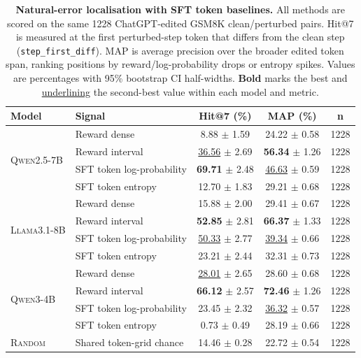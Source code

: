 \begin{table}[t]
\centering
\small
\setlength{\tabcolsep}{5pt}
\caption{\textbf{Natural-error localisation with SFT token baselines.} All methods are scored on the same 1228 ChatGPT-edited GSM8K clean/perturbed pairs. Hit@7 is measured at the first perturbed-step token that differs from the clean step (\texttt{step\_first\_diff}). MAP is average precision over the broader edited token span, ranking positions by reward/log-probability drops or entropy spikes. Values are percentages with 95\% bootstrap CI half-widths. \textbf{Bold} marks the best and \underline{underlining} the second-best value within each model and metric.}
\label{tab:localisation_chatgpt_step_sft_hit7_map}
\begin{tabular}{llccc}
\toprule
\textbf{Model} & \textbf{Signal} & \textbf{Hit@7 (\%)} & \textbf{MAP (\%)} & \textbf{n} \\
\midrule
\multirow{4}{*}{\textsc{Qwen2.5-7B}} & Reward dense & 8.88 $\pm$ 1.59 & 24.22 $\pm$ 0.58 & 1228 \\
 & Reward interval & \underline{36.56} $\pm$ 2.69 & \textbf{56.34} $\pm$ 1.26 & 1228 \\
 & SFT token log-probability & \textbf{69.71} $\pm$ 2.48 & \underline{46.63} $\pm$ 0.59 & 1228 \\
 & SFT token entropy & 12.70 $\pm$ 1.83 & 29.21 $\pm$ 0.68 & 1228 \\
\midrule
\multirow{4}{*}{\textsc{Llama3.1-8B}} & Reward dense & 15.88 $\pm$ 2.00 & 29.41 $\pm$ 0.67 & 1228 \\
 & Reward interval & \textbf{52.85} $\pm$ 2.81 & \textbf{66.37} $\pm$ 1.33 & 1228 \\
 & SFT token log-probability & \underline{50.33} $\pm$ 2.77 & \underline{39.34} $\pm$ 0.66 & 1228 \\
 & SFT token entropy & 23.21 $\pm$ 2.44 & 32.31 $\pm$ 0.73 & 1228 \\
\midrule
\multirow{4}{*}{\textsc{Qwen3-4B}} & Reward dense & \underline{28.01} $\pm$ 2.65 & 28.60 $\pm$ 0.68 & 1228 \\
 & Reward interval & \textbf{66.12} $\pm$ 2.57 & \textbf{72.46} $\pm$ 1.26 & 1228 \\
 & SFT token log-probability & 23.45 $\pm$ 2.32 & \underline{36.32} $\pm$ 0.57 & 1228 \\
 & SFT token entropy & 0.73 $\pm$ 0.49 & 28.19 $\pm$ 0.66 & 1228 \\
\midrule
\textsc{Random} & Shared token-grid chance & 14.46 $\pm$ 0.28 & 22.72 $\pm$ 0.54 & 1228 \\
\bottomrule
\end{tabular}
\end{table}
